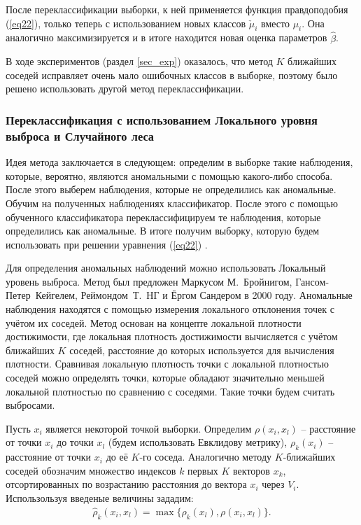 После переклассификации выборки, к ней применяется функция правдоподобия (\ref{eq22}), только теперь с использованием новых классов $\check{\mu}_i$ вместо $\mu_i$. 
Она аналогично максимизируется и в итоге находится новая оценка параметров $\hat{\beta}$.

В ходе экспериментов (раздел \ref{sec_exp}) оказалось, что метод $K$ ближайших соседей исправляет очень мало ошибочных классов в выборке, поэтому было решено использовать другой метод переклассификации.

\subsubsection{Переклассификация с использованием Локального уровня выброса и Случайного леса}
Идея метода заключается в следующем: определим в выборке такие наблюдения, которые, вероятно, являются аномальными с помощью какого-либо способа. После этого выберем наблюдения, которые не определились как аномальные.
Обучим на полученных наблюдениях классификатор. После этого с помощью обученного классификатора переклассифицируем те наблюдения, которые определились как аномальные. В итоге получим выборку, которую будем использовать при решении уравнения (\ref{eq22}) \cite{LOF}.

Для определения аномальных наблюдений можно использовать Локальный уровень выброса. Метод был предложен Маркусом М.~Бройнигом, Гансом-Петер~Кейгелем, Реймондом~Т.~НГ и Ёргом Сандером в 2000 году. Аномальные наблюдения находятся с помощью измерения локального отклонения точек с учётом их соседей.
Метод основан на концепте локальной плотности достижимости, где локальная плотность достижимости вычисляется с учётом ближайших $K$ соседей, расстояние до которых используется для вычисления плотности. Сравнивая локальную плотность точки с локальной плотностью соседей можно определять точки, которые обладают значительно меньшей локальной плотностью по сравнению с соседями. Такие точки будем считать выбросами.

Пусть $x_i$ является некоторой точкой выборки. Определим $\rho(x_i, x_l)$ -- расстояние от точки $x_i$ до точки $x_l$ (будем использовать Евклидову метрику), $\rho_k(x_i)$ -- расстояние от точки $x_i$ до её $K$-го соседа. 
Аналогично методу $K$-ближайших соседей обозначим множество индексов $k$ первых $K$ векторов $x_k$, отсортированных по возрастанию расстояния до вектора $x_i$ через $V_i$.
Использользуя введеные величины зададим:
\begin{eqnarray}
    \hat{\rho}_k(x_i, x_l) = \max\{\rho_k(x_l), \rho(x_i, x_l)\}.
\end{eqnarray}


